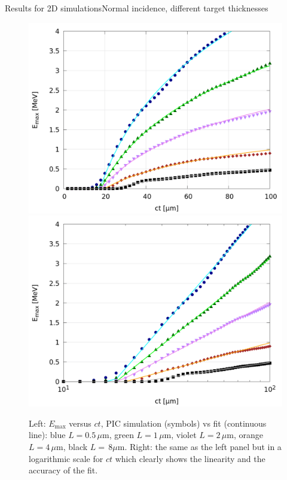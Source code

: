 \documentclass[final]{beamer}
\def\Emax{E_{\mathrm{max}}}
\begin{document}
\begin{frame}{Results for 2D simulations}{Normal incidence, different target thicknesses}
\begin{figure}
\centering
\includegraphics[width=0.45 \textwidth]{figs/Fig_2a.png}
\hspace{5mm}
\includegraphics[width=0.45 \textwidth]{figs/Fig_2b.png} 
\caption{
Left: $\Emax$ versus $ct$, PIC simulation (symbols) vs fit (continuous line): blue $L=0.5 \,\mu$m, green $L=1 \,\mu$m, violet $L=2 \,\mu$m, orange $L=4 \,\mu$m, black $L= \,8\mu$m. Right: the same as the left panel but in a logarithmic scale for $ct$ which clearly shows the linearity and the accuracy of the fit.
}
\end{figure} 
\end{frame}
\end{document}
